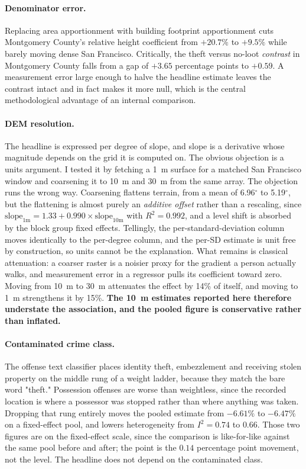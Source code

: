 \documentclass[10pt,letterpaper]{article}
\begin{document}
\paragraph{Denominator error.} Replacing area apportionment with building footprint
apportionment cuts Montgomery County's relative height coefficient from $+20.7\%$ to
$+9.5\%$ while barely moving dense San Francisco. Critically, the theft versus no-loot
\emph{contrast} in Montgomery County falls from a gap of $+3.65$ percentage points to
$+0.59$. A measurement error large enough to halve the headline estimate leaves the
contrast intact and in fact makes it more null, which is the central methodological
advantage of an internal comparison.

\paragraph{DEM resolution.} The headline is expressed per degree of slope, and slope is
a derivative whose magnitude depends on the grid it is computed on. The obvious
objection is a units argument. I tested it by fetching a 1~m surface for a matched
San Francisco window and coarsening it to 10~m and 30~m from the same array. The
objection runs the wrong way. Coarsening flattens terrain, from a mean of 6.96$^\circ$
to 5.19$^\circ$, but the flattening is almost purely an \emph{additive offset} rather
than a rescaling, since $\text{slope}_{1\text{m}} = 1.33 + 0.990 \times
\text{slope}_{10\text{m}}$ with $R^2 = 0.992$, and a level shift is absorbed by the
block group fixed effects. Tellingly, the per-standard-deviation column moves
identically to the per-degree column, and the per-SD estimate is unit free by
construction, so units cannot be the explanation. What remains is classical
attenuation: a coarser raster is a noisier proxy for the gradient a person actually
walks, and measurement error in a regressor pulls its coefficient toward zero. Moving
from 10~m to 30~m attenuates the effect by 14\% of itself, and moving to 1~m
strengthens it by 15\%. \textbf{The 10~m estimates reported here therefore understate
the association, and the pooled figure is conservative rather than inflated.}

\paragraph{Contaminated crime class.} The offense text classifier places identity
theft, embezzlement and receiving stolen property on the middle rung of a weight
ladder, because they match the bare word "theft." Possession offenses are worse than
weightless, since the recorded location is where a possessor was stopped rather than
where anything was taken. Dropping that rung entirely moves the pooled estimate from
$-6.61\%$ to $-6.47\%$ on a fixed-effect pool, and lowers heterogeneity from
$I^2 = 0.74$ to $0.66$. Those two figures are on the fixed-effect scale, since the
comparison is like-for-like against the same pool before and after; the point is the
$0.14$ percentage point movement, not the level. The headline does not depend on the
contaminated class.
\end{document}

